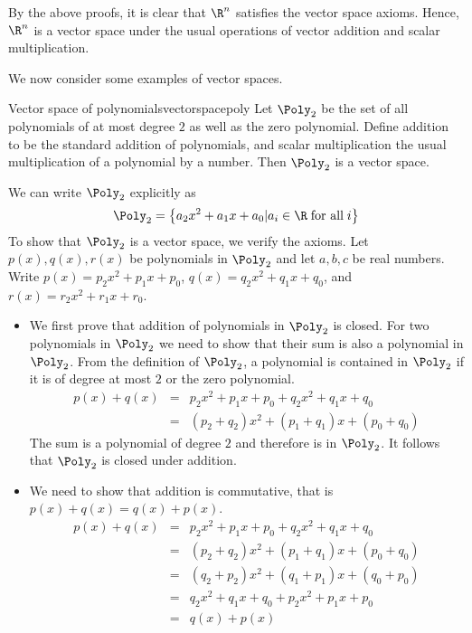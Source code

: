\begin{solution}
By the above proofs, it is clear that $\R^n$ satisfies the vector space axioms. Hence, $\R^n$ is a vector space under the usual operations of vector addition and scalar multiplication. 
\end{solution}

We now consider some examples of vector spaces. 

\begin{example}{Vector space of polynomials}{vectorspacepoly}
Let $\Poly_2$ be the set of all polynomials of at most degree $2$ as well as the zero polynomial. Define addition to be the standard addition of polynomials, and scalar multiplication the usual multiplication of a polynomial by a number. Then $\Poly_2$ is a vector space. 
\end{example}

\begin{solution}
We can write $\Poly_2$ explicitly as 
\[
\Poly_2 = \left\{ a_2x^2 + a_1x + a_0 | a_i \in \R \; \mbox{for all} \; i \right\}
\]
To show that $\Poly_2$ is a vector space, we verify the axioms. Let $p(x), q(x), r(x)$ be polynomials in $\Poly_2$ and let $a,b,c$ be real numbers. Write $p(x)=p_2x^2 + p_1x + p_0  $, $q(x)=q_2x^2 + q_1x + q_0  $, and $r(x)=r_2x^2 + r_1x + r_0$. 

\begin{itemize}
\item
We first prove that addition of polynomials in $\Poly_2$ is closed. For two polynomials in $\Poly_2$ we need to show that their sum is also a polynomial in $\Poly_2$. From the definition of $\Poly_2$, a polynomial is contained in $\Poly_2$ if it is of degree at most $2$ or the zero polynomial.
\begin{eqnarray*}
p(x) + q(x) &=& p_2x^2 + p_1x + p_0 + q_2x^2+ q_1x + q_0 \\
&=& (p_2+q_2)x^2 + (p_1+q_1)x + (p_0+q_0) 
\end{eqnarray*}
The sum is a polynomial of degree $2$ and therefore is in $\Poly_2$. It follows that $\Poly_2$ is closed under addition. 

\item
We need to show that addition is commutative, that is $p(x)+q(x) = q(x) + p(x)$.   
\begin{eqnarray*}
p(x) + q(x) &=&  p_2x^2 + p_1x + p_0 + q_2x^2 + q_1x + q_0\\
&=& (p_2+q_2)x^2 + (p_1+q_1)x + (p_0+q_0)  \\
&=&  (q_2+p_2)x^2 + (q_1+p_1)x + (q_0+p_0)  \\
&=& q_2x^2 + q_1x + q_0 + p_2x^2  + p_1x + p_0\\
&=& q(x) + p(x)
\end{eqnarray*}


\end{itemize}
\end{solution}
